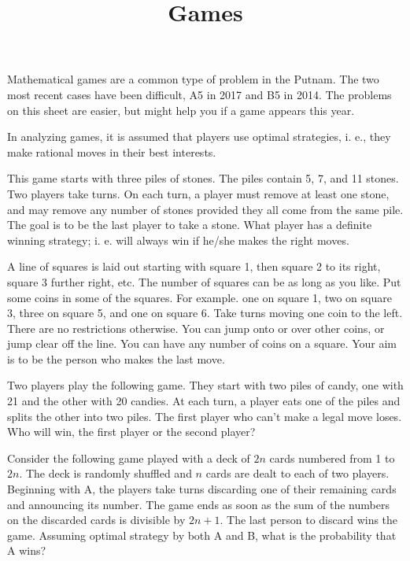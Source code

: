 \documentclass{article}
\begin{document}
\title{Games}
\author{}
\date{}
\maketitle



Mathematical games are a common type of problem in the Putnam. { }The two most recent cases have been difficult, A5 in 2017 and B5 in 2014. { }The
problems on this sheet are easier, but might help you if a game appears this year.



In analyzing games, it is  assumed that players use optimal strategies, i. e., they make rational moves in their best interests.

 This game starts with three piles of stones. { }The piles contain 5, 7, and 11 stones. { }Two players take turns. On each turn, a player
must remove at least one stone, and may remove any number of stones provided they all come from the same pile. The goal is to be the last player
to take a stone. What player has a definite winning strategy; i. e. will always win if he/she makes the right moves.

A line of squares is laid out starting with square 1, then square 2 to its right, square 3 further right, etc. { } The number of squares can be as
long as you like. Put some coins in some of the squares. { } For example. { } one on square 1, two on square 3, three on square 5, { }and one on
square 6. { } Take turns moving one coin to the left. { }There are no restrictions otherwise. { }You can jump onto or over other coins, or jump clear
off the line. You can have any number of coins on a square. { }Your aim is to be the person who makes the last move. { }

Two players play the following game. They start with two piles of candy, one with 21 and the other with 20 candies. At each turn, a player eats one
of the piles and splits the other into two piles. The first player who can{'}t make a legal move loses. Who will win, the first player or the second
player?

Consider the following game played with a deck of \(2n\) cards numbered from 1 to \(2n\). The deck is randomly shuffled and \(n\) cards are dealt
to each of two players. Beginning with A, the players take turns discarding one of their remaining cards and announcing its number. The game ends
as soon as the sum of the numbers on the discarded cards is divisible by \(2n + 1\). The last person to discard wins the game. Assuming optimal strategy
by both A and B, what is the probability that A wins?
\end{document}
